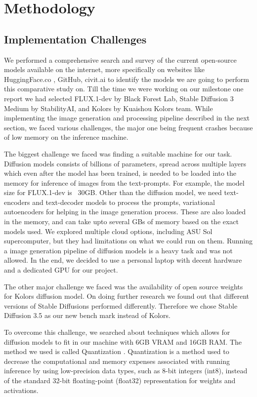\documentclass{article}
\begin{document}
\section{Methodology}

\subsection{Implementation Challenges}

We performed a comprehensive search and survey of the current open-source models available on the internet, more specifically on websites like HuggingFace.co \cite{hugging}, GitHub, civit.ai \cite{civit} to identify the models we are going to perform this comparative study on. Till the time we were working on our milestone one report we had selected FLUX.1-dev by Black Forest Lab, Stable Diffusion 3 Medium by StabilityAI, and Kolors by Kuaishou Kolors team. While implementing the image generation and processing pipeline described in the next section, we faced various challenges, the major one being frequent crashes because of low memory on the inference machine. 

The biggest challenge we faced was finding a suitable machine for our task. Diffusion models consists of billions of parameters, spread across multiple layers which even after the model has been trained, is needed to be loaded into the memory for inference of images from the text-prompts. For example, the model size for FLUX.1-dev is ~30GB. Other than the diffusion model, we need text-encoders and text-decoder models to process the prompts, variational autoencoders for helping in the image generation process. These are also loaded in the memory, and can take upto several GBs of memory based on the exact models used. We explored multiple cloud options, including ASU Sol supercomputer, but they had limitations on what we could run on them. Running a image generation pipeline of diffusion models is a heavy task and was not allowed. In the end, we decided to use a personal laptop with decent hardware and a dedicated GPU for our project.

The other major challenge we faced was the availability of open source weights for Kolors diffusion model. On doing further research we found out that different versions of Stable Diffusions performed differently. Therefore we chose Stable Diffusion 3.5 as our new bench mark instead of Kolors.

To overcome this challenge, we searched about techniques which allows for diffusion models to fit in our machine with 6GB VRAM and 16GB RAM. The method we used is called Quantization \cite{li2023qdiffusionquantizingdiffusionmodels}. Quantization is a method used to decrease the computational and memory expenses associated with running inference by using low-precision data types, such as 8-bit integers (int8), instead of the standard 32-bit floating-point (float32) representation for weights and activations.
\end{document}
